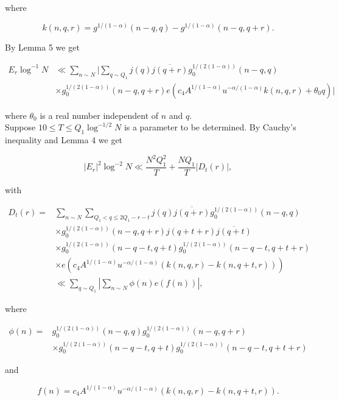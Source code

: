 \documentclass[10pt]{article}
\begin{document}
where

$$
k(n, q, r)=g^{1/(1-\alpha)}(n-q,q)-g^{1/(1-\alpha)}(n-q,q+r).
$$

By Lemma 5 we get

$$
\begin{aligned}
E_{r} \log ^{-1} N & \ll \sum_{n \sim N} \biggl|\sum_{q \sim Q_{1}} j(q) \overline{j(q+r)} g_{0}^{1 /(2(1-\alpha))}(n-q, q) \\
& \times g_{0}^{1 /(2(1-\alpha))}(n-q, q+r) e\left(c_{4} A^{1 /(1-\alpha)} u^{-\alpha /(1-\alpha)} k(n, q, r)+\theta_{0} q\right)\biggr|
\end{aligned}
$$

where $\theta_{0}$ is a real number independent of $n$ and $q$.\\
Suppose $10 \leq T \leq Q_{1} \log ^{-1 / 2} N$ is a parameter to be determined. By Cauchy's inequality and Lemma 4 we get


\begin{equation*}
\left|E_{r}\right|^{2} \log ^{-2} N \ll \frac{N^{2} Q_{1}^{2}}{T}+\frac{N Q_{1}}{T}\left|D_{t}(r)\right|, \tag{2.27}
\end{equation*}


with

$$
\begin{aligned}
D_{t}(r)= & \sum_{n \sim N} \sum_{Q_{1}<q \leq 2 Q_{1}-r-t} j(q) \overline{j(q+r)} g_{0}^{1 /(2(1-\alpha))}(n-q, q) \\
& \times g_{0}^{1 /(2(1-\alpha))}(n-q, q+r) j(q+t+r) \overline{j(q+t)} \\
& \times g_{0}^{1 /(2(1-\alpha))}(n-q-t, q+t) g_{0}^{1 /(2(1-\alpha))}(n-q-t, q+t+r) \\
& \times e\left(c_{4} A^{1 /(1-\alpha)} u^{-\alpha /(1-\alpha)}(k(n, q, r)-k(n, q+t, r))\right) \\
& \ll \sum_{q \sim Q_{1}}\left|\sum_{n \sim N} \phi(n) e(f(n))\right|,
\end{aligned}
$$

where

$$
\begin{aligned}
\phi(n)= & g_{0}^{1 /(2(1-\alpha))}(n-q, q) g_{0}^{1 /(2(1-\alpha))}(n-q, q+r) \\
& \times g_{0}^{1 /(2(1-\alpha))}(n-q-t, q+t) g_{0}^{1 /(2(1-\alpha))}(n-q-t, q+t+r)
\end{aligned}
$$

and

$$
f(n)=c_{4} A^{1 /(1-\alpha)} u^{-\alpha /(1-\alpha)}(k(n, q, r)-k(n, q+t, r)).
$$
\end{document}
